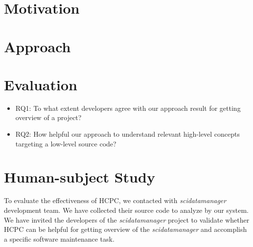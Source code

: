\section{Motivation}

\section{Approach}

\begin{algorithm}

\end{algorithm}


\section{Evaluation}

\begin{itemize}
    \item RQ1: To what extent developers agree with our approach result for getting overview of a project?
    \item RQ2: How helpful our approach to understand relevant high-level concepts targeting a low-level source code?
\end{itemize}

\section{Human-subject Study}
To evaluate the effectiveness of HCPC, we contacted with \emph{scidatamanager} development team. We have collected their source code to analyze by our system. We have invited the developers of the \emph{scidatamanager} project to validate whether HCPC can be helpful for getting overview of the \emph{scidatamanager} and accomplish a specific software maintenance task.
